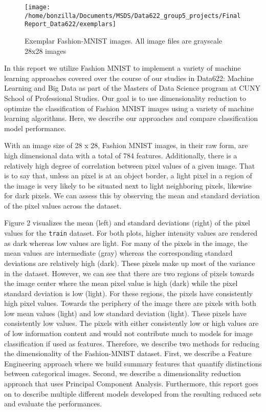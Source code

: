 \documentclass{article}
\begin{document}
\begin{figure}

{\centering \texttt{[image: /home/bonzilla/Documents/MSDS/Data622\_group5\_projects/FinalReport\_Data622/exemplars]} 

}

\caption{Exemplar Fashion-MNIST images. All image files are grayscale 28x28 images}\label{fig:unnamed-chunk-1}
\end{figure}

In this report we utilize Fashion MNIST to implement a variety of
machine learning approaches covered over the course of our studies in
Data622: Machine Learning and Big Data as part of the Masters of Data
Science program at CUNY School of Professional Studies. Our goal is to
use dimensionality reduction to optimize the classification of Fashion
MNIST images using a variety of machine learning algorithms. Here, we
describe our approaches and compare classification model performance.

With an image size of 28 x 28, Fashion MNIST images, in their raw form,
are high dimensional data with a total of 784 features. Additionally,
there is a relatively high degree of correlation between pixel values of
a given image. That is to say that, unless an pixel is at an object
border, a light pixel in a region of the image is very likely to be
situated next to light neighboring pixels, likewise for dark pixels. We
can assess this by observing the mean and standard deviation of the
pixel values across the dataset.

Figure 2 visualizes the mean (left) and standard deviations (right) of
the pixel values for the \texttt{train} dataset. For both plots, higher
intensity values are rendered as dark whereas low values are light. For
many of the pixels in the image, the mean values are intermediate (gray)
whereas the corresponding standard deviations are relatively high
(dark). These pixels make up most of the variance in the dataset.
However, we can see that there are two regions of pixels towards the
image center where the mean pixel value is high (dark) while the pixel
standard deviation is low (light). For these regions, the pixels have
consistently high pixel values. Towards the periphery of the image there
are pixels with both low mean values (light) and low standard deviation
(light). These pixels have consistently low values. The pixels with
either consistently low or high values are of low information content
and would not contribute much to models for image classification if used
as features. Therefore, we describe two methods for reducing the
dimensionality of the Fashion-MNIST dataset. First, we describe a
Feature Engineering approach where we build summary features that
quantify distinctions between categorical images. Second, we describe a
dimensionality reduction approach that uses Principal Component
Analysis. Furthermore, this report goes on to describe multiple
different models developed from the resulting reduced sets and evaluate
the performances.
\end{document}
